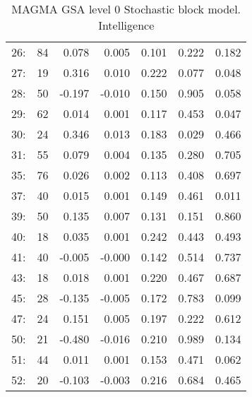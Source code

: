 \begin{table}[ht]
\begin{tabular}{lrrrrrr}
  26: &   84 & 0.078 & 0.005 & 0.101 & 0.222 & 0.182 \\ 
  27: &   19 & 0.316 & 0.010 & 0.222 & 0.077 & 0.048 \\ 
  28: &   50 & -0.197 & -0.010 & 0.150 & 0.905 & 0.058 \\ 
  29: &   62 & 0.014 & 0.001 & 0.117 & 0.453 & 0.047 \\ 
  30: &   24 & 0.346 & 0.013 & 0.183 & 0.029 & 0.466 \\ 
  31: &   55 & 0.079 & 0.004 & 0.135 & 0.280 & 0.705 \\ 
  35: &   76 & 0.026 & 0.002 & 0.113 & 0.408 & 0.697 \\ 
  37: &   40 & 0.015 & 0.001 & 0.149 & 0.461 & 0.011 \\ 
  39: &   50 & 0.135 & 0.007 & 0.131 & 0.151 & 0.860 \\ 
  40: &   18 & 0.035 & 0.001 & 0.242 & 0.443 & 0.493 \\ 
  41: &   40 & -0.005 & -0.000 & 0.142 & 0.514 & 0.737 \\ 
  43: &   18 & 0.018 & 0.001 & 0.220 & 0.467 & 0.687 \\ 
  45: &   28 & -0.135 & -0.005 & 0.172 & 0.783 & 0.099 \\ 
  47: &   24 & 0.151 & 0.005 & 0.197 & 0.222 & 0.612 \\ 
  50: &   21 & -0.480 & -0.016 & 0.210 & 0.989 & 0.134 \\ 
  51: &   44 & 0.011 & 0.001 & 0.153 & 0.471 & 0.062 \\ 
  52: &   20 & -0.103 & -0.003 & 0.216 & 0.684 & 0.465 \\ 
   \hline
\end{tabular}
\caption{MAGMA GSA level 0 Stochastic block model. Intelligence} 
\label{table:SBM_intelligence}
\end{table}

